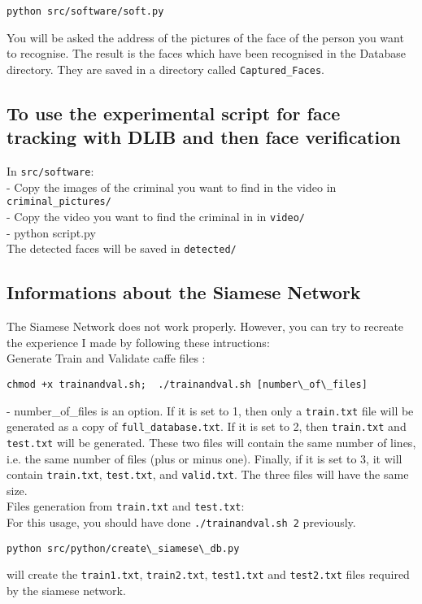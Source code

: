\begin{verbatim}
python src/software/soft.py
\end{verbatim}
You will be asked the address of the pictures of the face of the person you want to recognise. The result is the faces which have been recognised in the Database directory. They are saved in a directory called \texttt{Captured\_Faces}.


\subsection{To use the experimental script for face tracking with DLIB and then face verification}

In \texttt{src/software}:\\
- Copy the images of the criminal you want to find in the video in \texttt{criminal\_pictures/}\\
- Copy the video you want to find the criminal in in \texttt{video/}\\
- python script.py\\

The detected faces will be saved in \texttt{detected/}

\subsection{Informations about the Siamese Network}

The Siamese Network does not work properly. However, you can try to recreate the experience I made by following these intructions:\\

Generate Train and Validate caffe files : 
\begin{verbatim}
chmod +x trainandval.sh;  ./trainandval.sh [number\_of\_files]
\end{verbatim}
- number\_of\_files is an option. If it is set to 1, then only a \texttt{train.txt} file will be generated as a copy of \texttt{full\_database.txt}. If it is set to 2, then \texttt{train.txt} and \texttt{test.txt} will be generated. These two files will contain the same number of lines, i.e. the same number of files (plus or minus one). Finally, if it is set to 3, it will contain \texttt{train.txt}, \texttt{test.txt}, and \texttt{valid.txt}. The three files will have the same size.\\

Files generation from \texttt{train.txt} and \texttt{test.txt}:\\
For this usage, you should have done \texttt{./trainandval.sh 2} previously.\\
\begin{verbatim}
python src/python/create\_siamese\_db.py
\end{verbatim}
will create the \texttt{train1.txt}, \texttt{train2.txt}, \texttt{test1.txt} and \texttt{test2.txt} files required by the siamese network.

